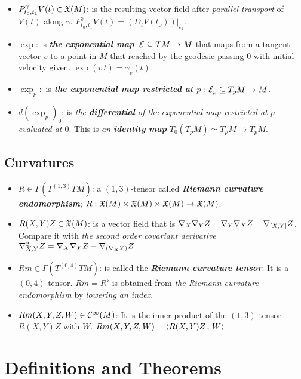 \documentclass[11pt]{article}
\begin{document}
\begin{itemize}
\item $P_{t_0, t_1}^{\gamma}V(t) \in {\mathfrak X}(M)$: \quad is the resulting vector field after \emph{parallel transport} of $V(t)$ along $\gamma$. $P_{t_0, t_1}^{\gamma}V(t) = (D_tV(t_0))|_{t_1}$. 

\item $\exp$: \quad is \emph{\textbf{the exponential map}}$: {\mathcal E} \subseteq TM \rightarrow M$ that maps from a tangent vector $v$ to a point in $M$ that reached by the geodesic passing $0$ with initial velocity given. $\exp(v\,t) = \gamma_v(t)$

\item $\exp_p:$ \quad is \emph{\textbf{the exponential map restricted at $p$}} $: {\mathcal E}_p \subseteq T_pM \rightarrow M$.

\item $d(\exp_p)_0$: \quad is \emph{the \textbf{differential} of the exponential map restricted at $p$ evaluated at $0$}. This is \emph{an \textbf{identity map}} $T_{0}(T_{p}M) \simeq T_pM \rightarrow T_pM$.
\end{itemize}

\subsection{Curvatures}
\begin{itemize}
\item $R \in \Gamma(T^{(1,3)}TM)$: \quad a $(1,3)$-tensor called \emph{\textbf{Riemann curvature endomorphism}}; $R:  {\mathfrak X}(M) \times  {\mathfrak X}(M) \times  {\mathfrak X}(M) \rightarrow  {\mathfrak X}(M)$.

\item $R(X, Y)Z \in {\mathfrak X}(M)$: \quad is a vector field that is $\nabla_{X}{\nabla_{Y}{Z}}- \nabla_{Y}{\nabla_{X}{Z}} - \nabla_{[X, Y]}{Z}$. Compare it with \emph{the second order covariant derivative} $\nabla^2_{X, Y}Z = \nabla_{X}{\nabla_{Y}{Z}} - \nabla_{(\nabla_{X}{Y})}{Z}$

\item $Rm  \in  \Gamma(T^{(0,4)}TM)$: \quad is called the \emph{\textbf{Riemann curvature tensor}}.  It is a $(0,4)$-tensor. $Rm = R^{\flat}$ is obtained from \emph{the Riemann curvature endomorphism} by \emph{lowering an index}.

\item $Rm(X, Y, Z, W) \in {\mathcal C}^{\infty}(M)$: \quad It is the inner product of the $(1,3)$-tensor $R(X,Y)Z$ with $W$. $Rm(X, Y, Z, W)= \left\langle R(X, Y)Z\,,\, W \right\rangle$
\end{itemize}

\newpage
\section{Definitions and Theorems}
\end{document}
